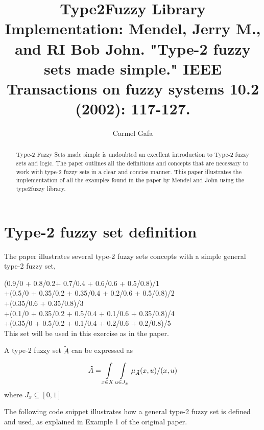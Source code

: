 \documentclass[]{article}
\title{Type2Fuzzy Library Implementation: Mendel, Jerry M., and RI Bob John. "Type-2 fuzzy sets made simple." IEEE Transactions on fuzzy systems 10.2 (2002): 117-127.}
\author{Carmel Gafa}
\begin{document}
\maketitle

\begin{abstract}
Type-2 Fuzzy Sets made simple is undoubted an excellent introduction to Type-2 fuzzy sets and logic. The paper outlines all the definitions and concepts that are necessary to work with type-2 fuzzy sets in a clear and concise manner. This paper illustrates the implementation of all the examples found in the paper by Mendel and John using the type2fuzzy library.
\end{abstract}

\section{Type-2 fuzzy set definition}

The paper illustrates several type-2 fuzzy sets concepts with a simple general type-2 fuzzy set,

{\small (0.9/0 + 0.8/0.2+ 0.7/0.4 + 0.6/0.6 + 0.5/0.8)/1}\\
{\small +(0.5/0 + 0.35/0.2 + 0.35/0.4 + 0.2/0.6 + 0.5/0.8)/2}\\
{\small +(0.35/0.6 + 0.35/0.8)/3}\\
{\small +(0.1/0 + 0.35/0.2 + 0.5/0.4 + 0.1/0.6 + 0.35/0.8)/4}\\
{\small +(0.35/0 + 0.5/0.2 + 0.1/0.4 + 0.2/0.6 + 0.2/0.8)/5}\\

This set will be used in this exercise as in the paper.

\bigskip

A type-2 fuzzy set $\tilde{A}$ can be expressed as 

\begin{equation}
\tilde{A}=\int\displaylimits_{x\in X}\int\displaylimits_{u\in J_{x}} \mu_{\tilde{A}}(x,u) \slash (x,u)
\end{equation} 
where $J_{x}\subseteq[0,1]$

The following code snippet illustrates how a general type-2 fuzzy set is defined and used, as explained in Example 1 of the original paper. 
\end{document}
